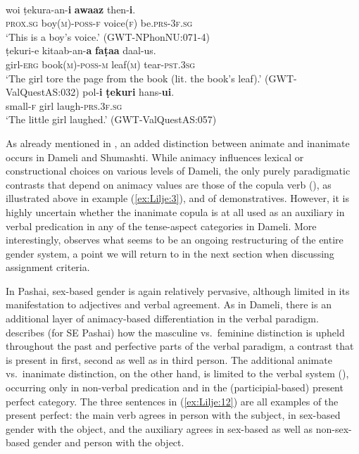 \documentclass[output=collectionpaper]{langsci/langscibook}
\begin{document}
\ea
\label{ex:Lilje:11}
\\
\begin{xlist}
\ex
\gll woi ṭekura-an-\textbf{i} \textbf{awaaz} then-\textbf{i}.    \\
\textsc{prox.sg} boy(\textsc{m})-\textsc{poss-f} voice(\textsc{f}) be.\textsc{prs-3f.sg}    \\
\glt `This is a boy's voice.' (GWT-NPhonNU:071-4)\\
\ex
\gll ṭekuri-e kitaab-an-\textbf{a} \textbf{faṭaa} daal{}-us.    \\
girl-\textsc{erg} book(\textsc{m})-\textsc{poss-m} leaf(\textsc{m}) tear-\textsc{pst.3sg}    \\
\glt `The girl tore the page from the book (lit. the book's leaf).' (GWT-ValQuestAS:032)
\ex
\gll pol-\textbf{i} \textbf{ṭekuri} hans-\textbf{ui}.     \\
small-\textsc{f} girl laugh-\textsc{prs.3f.sg}     \\
\glt `The little girl laughed.' (GWT-ValQuestAS:057)\\
\end{xlist}
\z

As already mentioned in , an added distinction between animate and inanimate occurs in Dameli and Shumashti. While animacy influences lexical or constructional choices on various levels of Dameli, the only purely paradigmatic contrasts that depend on animacy values are those of the copula verb (\citealt[121--125]{Perder2013}), as illustrated above in example (\ref{ex:Lilje:3}), and of demonstratives. However, it is highly uncertain whether the inanimate copula is at all used as an auxiliary in verbal predication in any of the tense-aspect categories in Dameli. More interestingly, \citet[51--55]{Perder2013} observes what seems to be an ongoing restructuring of the entire gender system, a point we will return to in the next section when discussing assignment criteria.

In Pashai, sex-based gender is again relatively pervasive, although limited in its manifestation to adjectives and verbal agreement. As in Dameli, there is an additional layer of animacy-based differentiation in the verbal paradigm. \citet[255]{Lehr2014} describes (for SE Pashai) how the masculine vs.\ feminine distinction is upheld throughout the past and perfective parts of the verbal paradigm, a contrast that is present in first, second as well as in third person. The additional animate vs.\ inanimate distinction, on the other hand, is limited to the verbal system (\citealt*[256--257]{Lehr2014}), occurring only in non-verbal predication and in the (participial-based) present perfect category. The three sentences in (\ref{ex:Lilje:12}) are all examples of the present perfect: the main verb agrees in person with the subject, in sex-based gender with the object, and the auxiliary agrees in sex-based as well as non-sex-based gender and person with the object.
\end{document}
